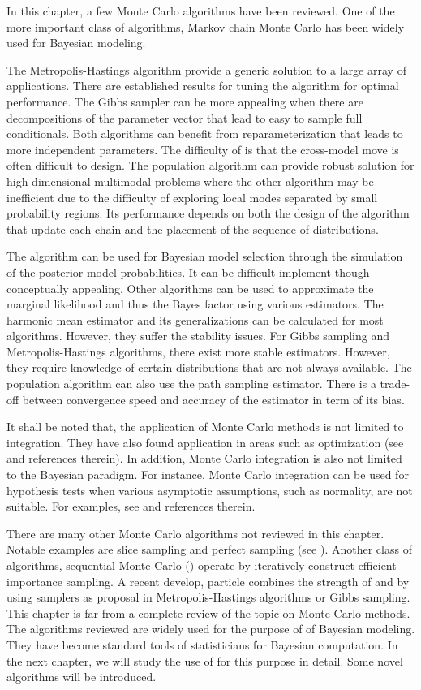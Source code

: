 In this chapter, a few Monte Carlo algorithms have been reviewed. One of the
more important class of algorithms, Markov chain Monte Carlo has been widely
used for Bayesian modeling.

The Metropolis-Hastings algorithm provide a generic solution to a large array
of applications. There are established results for tuning the algorithm for
optimal performance. The Gibbs sampler can be more appealing when there are
decompositions of the parameter vector that lead to easy to sample full
conditionals. Both algorithms can benefit from reparameterization that leads
to more independent parameters. The difficulty of \rjmcmc is that the
cross-model move is often difficult to design. The population \mcmc algorithm
can provide robust solution for high dimensional multimodal problems where the
other algorithm may be inefficient due to the difficulty of exploring local
modes separated by small probability regions. Its performance depends on both
the design of the \mcmc algorithm that update each chain and the placement of
the sequence of distributions.

The \rjmcmc algorithm can be used for Bayesian model selection through the
simulation of the posterior model probabilities. It can be difficult implement
though conceptually appealing. Other algorithms can be used to approximate the
marginal likelihood and thus the Bayes factor using various estimators. The
harmonic mean estimator and its generalizations can be calculated for most
\mcmc algorithms. However, they suffer the stability issues. For Gibbs
sampling and Metropolis-Hastings algorithms, there exist more stable
estimators. However, they require knowledge of certain distributions that are
not always available. The population \mcmc algorithm can also use the path
sampling estimator. There is a trade-off between convergence speed and
accuracy of the estimator in term of its bias.

It shall be noted that, the application of Monte Carlo methods is not limited
to integration. They have also found application in areas such as
optimization (see \cite[][chap.~5]{Robert:2004tn} and references therein). In
addition, Monte Carlo integration is also not limited to the Bayesian
paradigm. For instance, Monte Carlo integration can be used for hypothesis
tests when various asymptotic assumptions, such as normality, are not
suitable. For examples, see \cite[][sec.~3.2]{Robert:2004tn} and references
therein.

There are many other Monte Carlo algorithms not reviewed in this chapter.
Notable examples are slice sampling and perfect sampling (see \cite[][chap.~8
and~13]{Robert:2004tn}). Another class of algorithms, sequential Monte Carlo
(\smc) operate by iteratively construct efficient importance sampling. A
recent develop, particle \mcmc \cite{Andrieu:2010gc} combines the strength of
\mcmc and \smc by using \smc samplers as proposal in Metropolis-Hastings
algorithms or Gibbs sampling. This chapter is far from a complete review of
the topic on Monte Carlo methods. The algorithms reviewed are widely used for
the purpose of of Bayesian modeling. They have become standard tools of
statisticians for Bayesian computation. In the next chapter, we will study the
use of \smc for this purpose in detail. Some novel algorithms will be
introduced.
